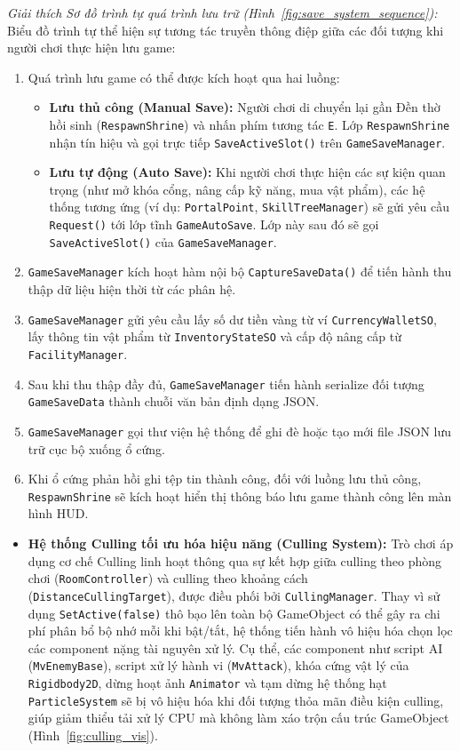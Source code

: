 \documentclass[../DoAn.tex]{subfiles}
\begin{document}
\textit{Giải thích Sơ đồ trình tự quá trình lưu trữ (Hình~\ref{fig:save_system_sequence}):}
Biểu đồ trình tự thể hiện sự tương tác truyền thông điệp giữa các đối tượng khi người chơi thực hiện lưu game:
\begin{enumerate}
    \item Quá trình lưu game có thể được kích hoạt qua hai luồng:
    \begin{itemize}
        \item \textbf{Lưu thủ công (Manual Save):} Người chơi di chuyển lại gần Đền thờ hồi sinh (\texttt{RespawnShrine}) và nhấn phím tương tác \texttt{E}. Lớp \texttt{RespawnShrine} nhận tín hiệu và gọi trực tiếp \texttt{SaveActiveSlot()} trên \texttt{GameSaveManager}.
        \item \textbf{Lưu tự động (Auto Save):} Khi người chơi thực hiện các sự kiện quan trọng (như mở khóa cổng, nâng cấp kỹ năng, mua vật phẩm), các hệ thống tương ứng (ví dụ: \texttt{PortalPoint}, \texttt{SkillTreeManager}) sẽ gửi yêu cầu \texttt{Request()} tới lớp tĩnh \texttt{GameAutoSave}. Lớp này sau đó sẽ gọi \texttt{SaveActiveSlot()} của \texttt{GameSaveManager}.
    \end{itemize}
    \item \texttt{GameSaveManager} kích hoạt hàm nội bộ \texttt{CaptureSaveData()} để tiến hành thu thập dữ liệu hiện thời từ các phân hệ.
    \item \texttt{GameSaveManager} gửi yêu cầu lấy số dư tiền vàng từ ví \texttt{CurrencyWalletSO}, lấy thông tin vật phẩm từ \texttt{InventoryStateSO} và cấp độ nâng cấp từ \texttt{FacilityManager}.
    \item Sau khi thu thập đầy đủ, \texttt{GameSaveManager} tiến hành serialize đối tượng \texttt{GameSaveData} thành chuỗi văn bản định dạng JSON.
    \item \texttt{GameSaveManager} gọi thư viện hệ thống để ghi đè hoặc tạo mới file JSON lưu trữ cục bộ xuống ổ cứng.
    \item Khi ổ cứng phản hồi ghi tệp tin thành công, đối với luồng lưu thủ công, \texttt{RespawnShrine} sẽ kích hoạt hiển thị thông báo lưu game thành công lên màn hình HUD.
\end{enumerate}

\begin{itemize}
    \item \textbf{Hệ thống Culling tối ưu hóa hiệu năng (Culling System):} Trò chơi áp dụng cơ chế Culling linh hoạt thông qua sự kết hợp giữa culling theo phòng chơi (\texttt{RoomController}) và culling theo khoảng cách (\texttt{DistanceCullingTarget}), được điều phối bởi \texttt{CullingManager}. Thay vì sử dụng \texttt{SetActive(false)} thô bạo lên toàn bộ GameObject có thể gây ra chi phí phân bổ bộ nhớ mỗi khi bật/tắt, hệ thống tiến hành vô hiệu hóa chọn lọc các component nặng tài nguyên xử lý. Cụ thể, các component như script AI (\texttt{MvEnemyBase}), script xử lý hành vi (\texttt{MvAttack}), khóa cứng vật lý của \texttt{Rigidbody2D}, dừng hoạt ảnh \texttt{Animator} và tạm dừng hệ thống hạt \texttt{ParticleSystem} sẽ bị vô hiệu hóa khi đối tượng thỏa mãn điều kiện culling, giúp giảm thiểu tải xử lý CPU mà không làm xáo trộn cấu trúc GameObject (Hình~\ref{fig:culling_vis}).
\end{itemize}
\end{document}
